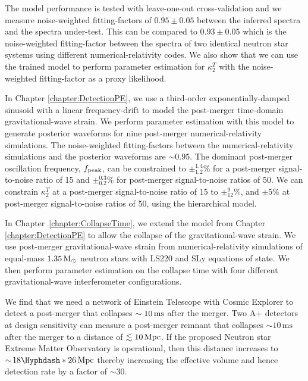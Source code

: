 \documentclass[../Thesis.tex]{subfiles}
\begin{document}
    The model performance is tested with leave-one-out cross-validation and we measure noise-weighted fitting-factors of $0.95\pm 0.05$ between the inferred spectra and the spectra under-test.
    This can be compared to $0.93\pm 0.05$ which is the noise-weighted fitting-factor between the spectra of two identical neutron star systems using different numerical-relativity codes.
    We also show that we can use the trained model to perform parameter estimation for $\kappa_2^T$ with the noise-weighted fitting-factor as a proxy likelihood.
    
    In Chapter \ref{chapter:DetectionPE}, we use a third-order exponentially-damped sinusoid with a linear frequency-drift to model the post-merger time-domain gravitational-wave strain.
    We perform parameter estimation with this model to generate posterior waveforms for nine post-merger numerical-relativity simulations.
    The  noise-weighted fitting-factors between the numerical-relativity simulations and the posterior waveforms are $\sim 0.95$.
    The dominant post-merger oscillation frequency, $f_{\mathrm{peak}}$, can be constrained to $\pm_{1.2}^{1.4}\%$ for a post-merger signal-to-noise ratio of 15 and $\pm_{0.2}^{0.3}\%$ for post-merger signal-to-noise ratios of 50.
    We can constrain $\kappa_2^T$ at a post-merger signal-to-noise ratio of 15 to $\pm^{9}_{12}\%$, and $\pm 5\%$ at post-merger signal-to-noise ratios of 50,  using the hierarchical model. \par

    In Chapter~\ref{chapter:CollapseTime}, we extend the model from Chapter \ref{chapter:DetectionPE} to allow the collapse of the gravitational-wave strain.
    We use post-merger gravitational-wave strain from numerical-relativity simulations of equal-mass $1.35\,\mathrm{M}_{\odot}$ neutron stars with LS220 and SLy equations of state.
    We then perform parameter estimation on the collapse time with four different gravitational-wave interferometer configurations. \par
    
    We find that we need a network of Einstein Telescope with Cosmic Explorer to detect a post-merger that collapses $\sim10\,\mathrm{ms}$ after the merger.
    Two A+ detectors at design sensitivity can measure a post-merger remnant that collapses $\sim\!10\,\mathrm{ms}$  after the merger to a distance of $\lesssim 10\,\mathrm{Mpc}$.
    If the proposed Neutron star Extreme Matter Observatory is operational, then this distance increases to $\sim\!18\Hyphdash*26\,\Mpc$ thereby increasing the effective volume and hence detection rate by a factor of $\sim 30$.
\par
\end{document}
